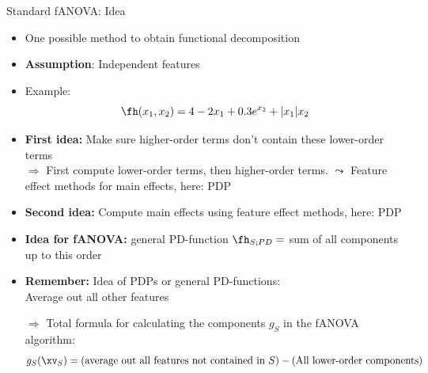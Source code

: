 \documentclass[11pt,compress,t,notes=noshow, aspectratio=169, xcolor=table]{beamer}
\begin{document}

\begin{frame}{Standard fANOVA: Idea}

    \begin{itemize}
        \item One possible method to obtain functional decomposition
        \item \textbf{Assumption}: Independent features
        \item Example:
        \begin{equation}
            \fh(x_1, x_2) = 4 - 2x_1 + 0.3 e^{x_2} + |x_1|x_2
        \end{equation}
        \item \textbf{First idea:} Make sure higher-order terms don't contain these lower-order terms \\
        \(\Rightarrow\) First compute lower-order terms, then higher-order terms.
        \(\leadsto\) Feature effect methods for main effects, here: PDP
        \item \textbf{Second idea:} Compute main effects using feature effect methods, here: PDP
        \item \textbf{Idea for fANOVA:} general PD-function $\fh_{S;PD} =$ sum of all components up to this order
        \item \textbf{Remember:} Idea of PDPs or general PD-functions: \\
        Average out all other features
        \item[$\Rightarrow$] Total formula for calculating the components \(g_S\) in the fANOVA algorithm:
        \begin{equation*}
            g_{S} (\xv_S) = (\text{average out all features not contained in } S) - (\text{All lower-order components})
        \end{equation*}
    \end{itemize}

    
    
\end{frame}
\end{document}
